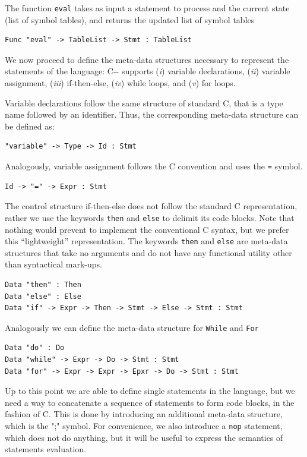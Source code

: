 The function \texttt{eval} takes as input a statement to process and the current state (list of symbol tables), and returns the updated list of symbol tables

\begin{lstlisting}
Func "eval" -> TableList -> Stmt : TableList
\end{lstlisting}

We now proceed to define the meta-data structures necessary to represent the statements of the language: C-{}- supports (\textit{i}) variable declarations, (\textit{ii}) variable assignment, (\textit{iii}) if-then-else, (\textit{iv}) while loops, and (\textit{v}) for loops.

Variable declarations follow the same structure of standard C, that is a type name followed by an identifier. Thus, the corresponding meta-data structure can be defined as:

\begin{lstlisting}
"variable" -> Type -> Id : Stmt
\end{lstlisting}

\noindent
Analogously, variable assignment follows the C convention and uses the \texttt{=} symbol.

\begin{lstlisting}
Id -> "=" -> Expr : Stmt
\end{lstlisting}

The control structure if-then-else does not follow the standard C representation, rather we use the keywords \texttt{then} and \texttt{else} to delimit its code blocks. Note that nothing would prevent to implement the conventional C syntax, but we prefer this ``lightweight'' representation. The keywords \texttt{then} and \texttt{else} are meta-data structures that take no arguments and do not have any functional utility other than syntactical mark-ups.

\begin{lstlisting}
Data "then" : Then
Data "else" : Else
Data "if" -> Expr -> Then -> Stmt -> Else -> Stmt : Stmt
\end{lstlisting}

Analogously we can define the meta-data structure for \texttt{While} and \texttt{For}

\begin{lstlisting}
Data "do" : Do
Data "while" -> Expr -> Do -> Stmt : Stmt
Data "for" -> Expr -> Expr -> Epxr -> Do -> Stmt : Stmt
\end{lstlisting}

\noindent
Up to this point we are able to define single statements in the language, but we need a way to concatenate a sequence of statements to form code blocks, in the fashion of C. This is done by introducing an additional meta-data structure, which is the ";" symbol. For convenience, we also introduce a \texttt{nop} statement, which does not do anything, but it will be useful to express the semantics of statements evaluation.

